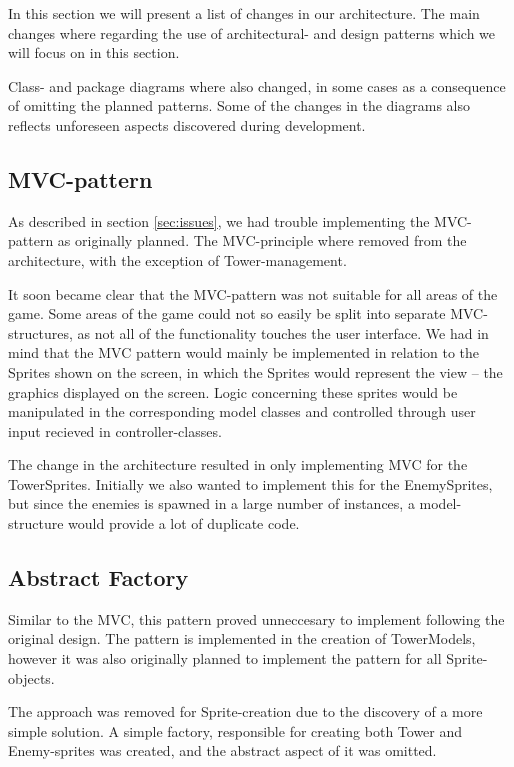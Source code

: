 \label{sec:changes}In this section we will present a list of changes in our architecture. The main changes where regarding the use of architectural- and design patterns which we will focus on in this section. 

Class- and package diagrams where also changed, in some cases as a consequence of omitting the planned patterns. Some of the changes in the diagrams also reflects unforeseen aspects discovered during development.

\subsection{MVC-pattern}

As described in section \ref{sec:issues}, we had trouble implementing the MVC-pattern as originally planned. The MVC-principle where removed from the architecture, with the exception of Tower-management.  

It soon became clear that the MVC-pattern was not suitable for all areas of the game. Some areas of the game could not so easily be split into separate MVC-structures, as not all of the functionality touches the user interface. We had in mind that the MVC pattern would mainly be implemented in relation to the Sprites shown on the screen, in which the Sprites would represent the view -- the graphics displayed on the screen. Logic concerning these sprites would be manipulated in the corresponding model classes and controlled through user input recieved in controller-classes.

The change in the architecture resulted in only implementing MVC for the TowerSprites. Initially we also wanted to implement this for the EnemySprites, but since the enemies is spawned in a large number of instances, a model-structure would provide a lot of duplicate code.

\subsection{Abstract Factory}

Similar to the MVC, this pattern proved unneccesary to implement following the original design. The pattern is implemented in the creation of TowerModels, however it was also originally planned to implement the pattern for all Sprite-objects. 

The approach was removed for Sprite-creation due to the discovery of a more simple solution. A simple factory, responsible for creating both Tower and Enemy-sprites was created, and the abstract aspect of it was omitted.  


